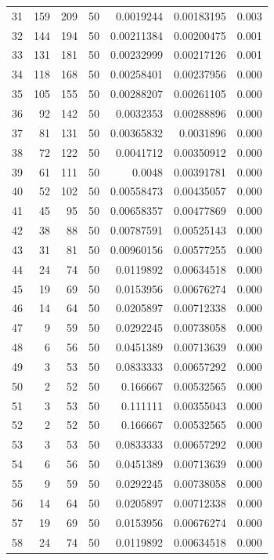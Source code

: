 \begin{tabular}{r r r r r r r}
31 & 159 & 209 & 50 & 0.0019244 & 0.00183195 & 0.003 \\
32 & 144 & 194 & 50 & 0.00211384 & 0.00200475 & 0.001 \\
33 & 131 & 181 & 50 & 0.00232999 & 0.00217126 & 0.001 \\
34 & 118 & 168 & 50 & 0.00258401 & 0.00237956 & 0.000 \\
35 & 105 & 155 & 50 & 0.00288207 & 0.00261105 & 0.000 \\
36 & 92 & 142 & 50 & 0.0032353 & 0.00288896 & 0.000 \\
37 & 81 & 131 & 50 & 0.00365832 & 0.0031896 & 0.000 \\
38 & 72 & 122 & 50 & 0.0041712 & 0.00350912 & 0.000 \\
39 & 61 & 111 & 50 & 0.0048 & 0.00391781 & 0.000 \\
40 & 52 & 102 & 50 & 0.00558473 & 0.00435057 & 0.000 \\
41 & 45 & 95 & 50 & 0.00658357 & 0.00477869 & 0.000 \\
42 & 38 & 88 & 50 & 0.00787591 & 0.00525143 & 0.000 \\
43 & 31 & 81 & 50 & 0.00960156 & 0.00577255 & 0.000 \\
44 & 24 & 74 & 50 & 0.0119892 & 0.00634518 & 0.000 \\
45 & 19 & 69 & 50 & 0.0153956 & 0.00676274 & 0.000 \\
46 & 14 & 64 & 50 & 0.0205897 & 0.00712338 & 0.000 \\
47 & 9 & 59 & 50 & 0.0292245 & 0.00738058 & 0.000 \\
48 & 6 & 56 & 50 & 0.0451389 & 0.00713639 & 0.000 \\
49 & 3 & 53 & 50 & 0.0833333 & 0.00657292 & 0.000 \\
50 & 2 & 52 & 50 & 0.166667 & 0.00532565 & 0.000 \\
51 & 3 & 53 & 50 & 0.111111 & 0.00355043 & 0.000 \\
52 & 2 & 52 & 50 & 0.166667 & 0.00532565 & 0.000 \\
53 & 3 & 53 & 50 & 0.0833333 & 0.00657292 & 0.000 \\
54 & 6 & 56 & 50 & 0.0451389 & 0.00713639 & 0.000 \\
55 & 9 & 59 & 50 & 0.0292245 & 0.00738058 & 0.000 \\
56 & 14 & 64 & 50 & 0.0205897 & 0.00712338 & 0.000 \\
57 & 19 & 69 & 50 & 0.0153956 & 0.00676274 & 0.000 \\
58 & 24 & 74 & 50 & 0.0119892 & 0.00634518 & 0.000 \\

\end{tabular}
